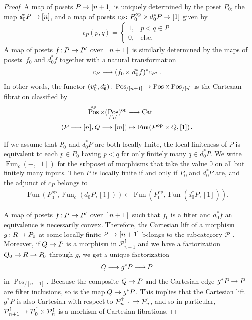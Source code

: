 \documentclass[10pt]{amsart}
\numberwithin{equation}{section}
\theoremstyle{definition}
\DeclareMathOperator{\Fun}{Fun}
\DeclareMathOperator{\op}{op}
\DeclareMathOperator{\Pos}{Pos}
\newcommand{\Cat}{\mathrm{Cat}\vphantom{t}}
\newcommand{\cP}{\mathcal{P}}
\renewcommand{\to}{\mathchoice{\longrightarrow}{\rightarrow}{}{}}
\begin{document}
\begin{proof}
	A map of posets $P\to [n+1]$ is uniquely determined by the poset $P_{0}$, the map $d_{0}^{*}P\to [n]$, and a map of posets $c_{P}\colon P_{0}^{\op}\times d_{0}^{*}P \to [1]$ given by
	\begin{align*}
		c_{P}(p,q) = \begin{cases}
			1, & p<q \in P \\
			0, & \text{else.}
		\end{cases}
	\end{align*}
	A map of posets $f\colon P \to P'$ over $[n+1]$ is similarly determined by the maps of posets~$f_{0}$ and $d_{0}^{*}f$ together with a natural transformation
	\begin{align*}
		c_{P} \to (f_{0} \times d_{0}^{*}f)^{*}c_{P'} \,.
	\end{align*}
	In other words, the functor $(v_{0}^{*},d_{0}^{*}) \colon \Pos_{/[n+1]} \to \Pos \times \Pos_{/[n]}$ is the Cartesian fibration classified by
	\begin{align}\label{eq:cP_as_profunctors}
		\Pos^{\op} \times (\Pos_{/[n]})^{\op}  &\to \Cat \\
		(P\to [n],Q\to [m])&\mapsto \Fun(P^{\op}\times Q, [1]) \,. \nonumber
	\end{align}

	If we assume that $P_{0}$ and $d_{0}^{*}P$ are both locally finite, the local finiteness of $P$ is equivalent to each $p\in P_{0}$ having $p<q$ for only finitely many $q\in d_{0}^{*}P$.
  We write $\Fun_{c}(-,[1])$ for the subposet of morphisms that take the value $0$ on all but finitely many inputs.
  Then $P$ is locally finite if and only if $P_{0}$ and $d_{0}^{*}P$ are, and the adjunct of $c_{P}$ belongs to
	\begin{align*}
		\Fun(P_{0}^{\op}, \Fun_{c}(d_{0}P, [1])) \subset \Fun(P_{0}^{\op}, \Fun(d_{0}^{*}P, [1])).
	\end{align*}

	A map of posets $f\colon P \to P'$ over $[n+1]$ such that $f_{0}$ is a filter and $d_{0}^{*}f$ an equivalence is necessarily convex.
  Therefore, the Cartesian lift of a morphism $g\colon R \to P_{0}$ at some locally finite $P\to [n+1]$ belongs to the subcategory $\cP^{\uparrow}$.
  Moreover, if $Q\to P$ is a morphism in $\cP^{\uparrow}_{n+1}$ and we have a factorization $Q_{0} \to R \to P_{0}$ through $g$, we get a unique factorization
	\begin{align*}
		Q \to g^{*}P \to P
	\end{align*}
	in $\Pos_{/[n+1]}$.
  Because the composite $Q\to P$ and the Cartesian edge $g^{*}P\to P$ are filter inclusions, so is the map $Q\to g^{*}P$.
  This implies that the Cartesian lift $g^{*}P$ is also Cartesian with respect to $\cP^{\uparrow}_{n+1} \to \cP^{\uparrow}_{n}$, and so in particular, $\cP^{\uparrow}_{n+1}\to \cP^{\uparrow}_{0}\times \cP^{\uparrow}_{n}$ is a morhism of Cartesian fibrations.


\end{proof}
\end{document}
